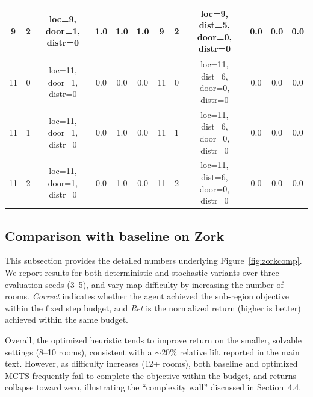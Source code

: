 \documentclass{article}
\begin{document}
\begin{table}[h]
{\begin{tabular}{ccc ccc | ccc ccc}
    9  & 2 & \scriptsize loc=9, door=1, distr=0 & 1.0 & 1.0 & 1.0 & 9  & 2 & \scriptsize loc=9, dist=5, door=0, distr=0 & 0.0 & 0.0 & 0.0 \\
    \midrule
    11 & 0 & \scriptsize loc=11, door=1, distr=0 & 0.0 & 0.0 & 0.0 & 11 & 0 & \scriptsize loc=11, dist=6, door=0, distr=0 & 0.0 & 0.0 & 0.0 \\
    11 & 1 & \scriptsize loc=11, door=1, distr=0 & 0.0 & 1.0 & 0.0 & 11 & 1 & \scriptsize loc=11, dist=6, door=0, distr=0 & 0.0 & 0.0 & 0.0 \\
    11 & 2 & \scriptsize loc=11, door=1, distr=0 & 0.0 & 1.0 & 0.0 & 11 & 2 & \scriptsize loc=11, dist=6, door=0, distr=0 & 0.0 & 0.0 & 0.0 \\
    \bottomrule
  \end{tabular}%
  }
\end{table}


\subsection{Comparison with baseline on Zork}
\label{apdx:zork}
This subsection provides the detailed numbers underlying Figure~\ref{fig:zorkcomp}. We report results for both deterministic and stochastic variants over three evaluation seeds (3--5), and vary map difficulty by increasing the number of rooms. \textit{Correct} indicates whether the agent achieved the sub-region objective within the fixed step budget, and \textit{Ret} is the normalized return (higher is better) achieved within the same budget.

Overall, the optimized heuristic tends to improve return on the smaller, solvable settings (8--10 rooms), consistent with a \(\sim 20\%\) relative lift reported in the main text. However, as difficulty increases (12+ rooms), both baseline and optimized MCTS frequently fail to complete the objective within the budget, and returns collapse toward zero, illustrating the ``complexity wall'' discussed in Section~4.4.
\end{document}

